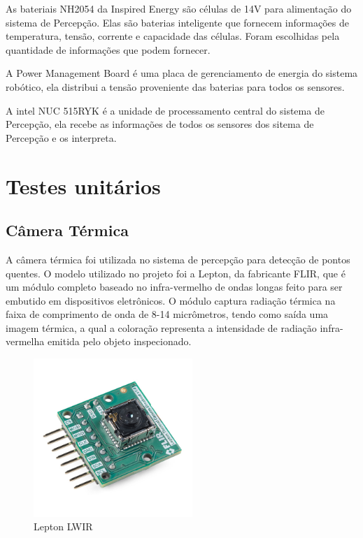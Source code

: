 As bateriais NH2054 da Inspired Energy são células de 14V para alimentação do sistema de Percepção. Elas são baterias inteligente que fornecem informações de temperatura, tensão, corrente e capacidade das células. Foram escolhidas pela quantidade de informações que podem fornecer.



A Power Management Board é uma placa de gerenciamento de energia do sistema robótico, ela distribui a tensão proveniente das baterias para todos os sensores.



A intel NUC 515RYK é a unidade de processamento central do sistema de Percepção, ela recebe as informações de todos os sensores dos sitema de Percepção e os interpreta.
\section{Testes unitários}
\label{sec:testu}
	\subsection{Câmera Térmica}
	
		A câmera térmica foi utilizada no sistema de percepção para detecção de pontos quentes. O modelo utilizado no projeto foi a Lepton, da fabricante FLIR, que é um módulo completo baseado no infra-vermelho de ondas longas feito para ser embutido em dispositivos eletrônicos. O módulo captura radiação térmica na faixa de comprimento de onda de 8-14 micrômetros, tendo como saída uma imagem térmica, a qual a coloração representa a intensidade de radiação infra-vermelha emitida pelo objeto inspecionado.
		
		\begin{figure}[!ht]
		   \centering
		   \includegraphics[width=6cm]{Figures/lepton_flir.jpg}
		   \caption{Lepton LWIR}
		   \label{fig:lepton}
		\end{figure}
		
